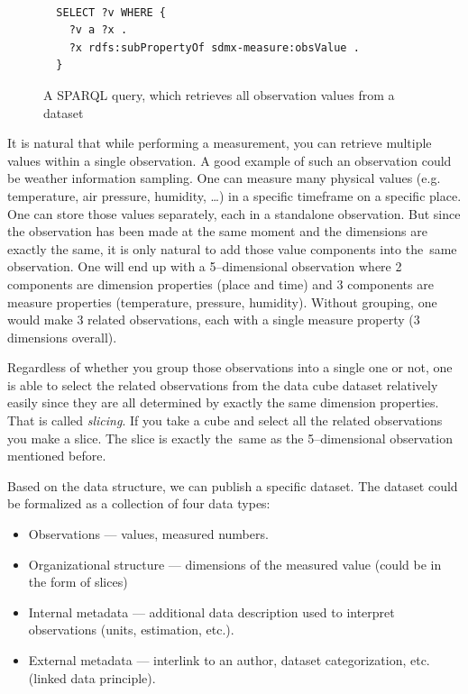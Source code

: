\begin{figure}
\begin{verbatim}
  
  SELECT ?v WHERE {
    ?v a ?x .
    ?x rdfs:subPropertyOf sdmx-measure:obsValue .
  }

\end{verbatim}
\caption{A SPARQL query, which retrieves all observation values from a dataset}
\label{fig:sparql-obsValue}
\end{figure}

It is natural that while performing a measurement, you can retrieve multiple
values within a single observation. A good example of such an observation could be weather
information sampling. One can measure many physical values (e.g. temperature, air pressure,
humidity, …) in a specific timeframe on a specific place. One can store those values separately,
each in a standalone observation. But since the observation has been made at the same moment
and the dimensions are exactly the same, it is only natural to add those value components into
the~same observation. One will end up with a 5--dimensional observation where 2 components 
are dimension properties (place and time) and 3 components are measure properties
(temperature, pressure, humidity). Without grouping, one would make 3 related observations,
each with a single measure property (3 dimensions overall).

Regardless of whether you group those observations into a single one or not, one is able
to select the related observations from the data cube dataset relatively easily since they
are all determined by exactly the same dimension properties. That is called \emph{slicing}.
If you take a cube and select all the related observations you make a slice. The slice is exactly
the~same as the 5--dimensional observation mentioned before.

Based on the data structure, we can publish a specific dataset. The dataset could be formalized
as a collection of four data types:

\begin{itemize}
\item Observations --- values, measured numbers.
\item Organizational structure --- dimensions of the measured value (could be in the form of slices)
\item Internal metadata --- additional data description used to interpret observations (units, estimation,
etc.).
\item External metadata --- interlink to an author, dataset categorization, etc. (linked data 
principle).
\end{itemize}


